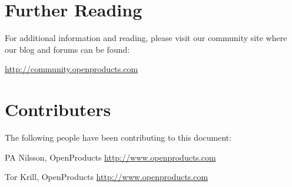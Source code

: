 \documentclass[12pt,a4paper,titlepage]{article}
\begin{document}
\newpage
\section{Further Reading}
For additional information and reading, please visit our community site where our blog and forums can be found:

\href{http://community.openproducts.com}{http://community.openproducts.com}
\newpage
\section{Contributers}
The following people have been contributing to this document:
\begin{description}
\item PA Nilsson, OpenProducts \href{http://www.openproducts.com}{http://www.openproducts.com}
\item Tor Krill, OpenProducts \href{http://www.openproducts.com}{http://www.openproducts.com}
\end{description}
\end{document}
